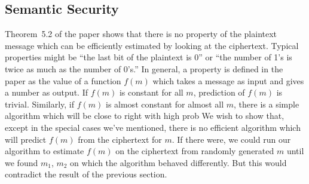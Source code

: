 \subsection{Semantic Security} Theorem~5.2 of the paper shows that
there is no property of the plaintext message which can be efficiently
estimated by looking at the ciphertext.  Typical properties might
be ``the last bit of the plaintext is 0'' or ``the number of 1's
is twice as much as the number of 0's.''  In general, a property
is defined in the paper as the value of a function $f(m)$ which
takes a message as input and gives a number as output.  If $f(m)$
is constant for all $m$, prediction of $f(m)$ is trivial.  Similarly,
if $f(m)$ is almost constant for almost all $m$, there is a simple
algorithm which will be close to right with high prob%
 \pq We wish to show that, except in the special cases we've  mentioned,
there is no efficient algorithm which will predict $f(m)$ from
the ciphertext for $m$.  If there were,
  we  could run our algorithm to estimate $f(m)$
on the ciphertext from randomly generated $m$ until we found $m_1$,
$m_2$ on which the algorithm behaved differently.  But this would
contradict the result of the previous section.
